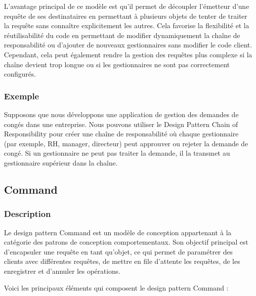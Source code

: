L'avantage principal de ce modèle est qu'il permet de découpler l'émetteur d'une requête de ses destinataires en permettant à plusieurs objets de tenter de traiter la requête sans connaître explicitement les autres. Cela favorise la flexibilité et la réutilisabilité du code en permettant de modifier dynamiquement la chaîne de responsabilité ou d'ajouter de nouveaux gestionnaires sans modifier le code client. Cependant, cela peut également rendre la gestion des requêtes plus complexe si la chaîne devient trop longue ou si les gestionnaires ne sont pas correctement configurés.


\subsubsection{Exemple}

Supposons que nous développons une application de gestion des demandes de congés dans une entreprise. Nous pouvons utiliser le Design Pattern Chain of Responsibility pour créer une chaîne de responsabilité où chaque gestionnaire (par exemple, RH, manager, directeur) peut approuver ou rejeter la demande de congé. Si un gestionnaire ne peut pas traiter la demande, il la transmet au gestionnaire supérieur dans la chaîne.




\newpage

\subsection{Command}

\subsubsection{Description}

Le design pattern Command est un modèle de conception appartenant à la catégorie des patrons de conception comportementaux. Son objectif principal est d'encapsuler une requête en tant qu'objet, ce qui permet de paramétrer des clients avec différentes requêtes, de mettre en file d'attente les requêtes, de les enregistrer et d'annuler les opérations.

Voici les principaux éléments qui composent le design pattern Command :

